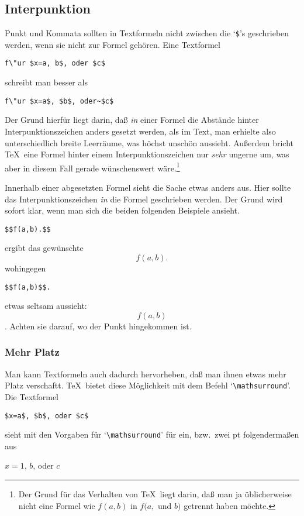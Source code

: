 \subsection{Interpunktion}
Punkt und Kommata sollten in Textformeln nicht zwischen die
`\verb|$|'s geschrieben werden, wenn sie nicht zur Formel geh\"oren.
Eine Textformel
\begin{verbatim}
f\"ur $x=a, b$, oder $c$
\end{verbatim}
schreibt man besser als
\begin{verbatim}
f\"ur $x=a$, $b$, oder~$c$
\end{verbatim}
Der Grund hierf\"ur liegt darin, da\ss{} {\em in} einer Formel die Abst\"ande
hinter Interpunktionszeichen anders gesetzt werden, als im Text, man
erhielte also unterschiedlich breite 
Leerr\"aume, was h\"ochst unsch\"on
aussieht. Au\ss{}erdem bricht \TeX\ eine Formel hinter einem
Interpunktionszeichen nur {\em sehr} ungerne um, was aber in diesem
Fall gerade w\"unschenswert w\"are.\footnote{Der Grund f\"ur das Verhalten
von \TeX\ liegt darin, da\ss{} man ja \"ublicherweise nicht eine Formel wie
$f(a,b)$ in $f(a,$ und $b)$ getrennt haben m\"ochte.}

Innerhalb einer 
abgesetzten Formel sieht die Sache etwas anders aus.
Hier sollte das Interpunktionszeichen {\em in} die Formel geschrieben
werden. Der Grund wird sofort klar, wenn man sich die beiden folgenden
Beispiele ansieht.
\begin{verbatim}
$$f(a,b).$$
\end{verbatim}
ergibt das gew\"unschte
$$f(a,b).$$
wohingegen
\begin{verbatim}
$$f(a,b)$$.
\end{verbatim}
etwas seltsam aussieht:
$$f(a,b)$$.
Achten sie darauf, wo der Punkt hingekommen ist.
\subsubsection{Mehr Platz}
Man kann Textformeln auch dadurch hervorheben, da\ss{} man ihnen etwas
mehr Platz verschaftt. \TeX\ bietet diese M\"oglichkeit mit dem Befehl
`\verb|\mathsurround|'. Die Textformel
\begin{verbatim}
$x=a$, $b$, oder $c$
\end{verbatim}
sieht mit den Vorgaben f\"ur `\verb|\mathsurround|' f\"ur ein, bzw.\ zwei
pt folgenderma\ss{}en aus

{\mathsurround=1pt$x=1$, $b$, oder $c$}

